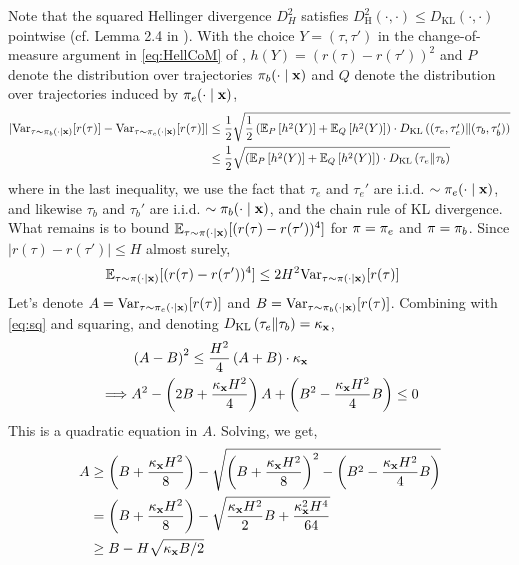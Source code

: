Note that the squared Hellinger divergence $D_H^2$ satisfies $D_{\mathrm{H}}^2 (\cdot,\cdot) \le D_{\mathrm{KL}} (\cdot,\cdot)$ pointwise (cf. Lemma 2.4 in \citet{tsybakov2009nonparametric}). With the choice $Y = (\tau,\tau')$ in the change-of-measure argument in \cref{eq:HellCoM} of , $h (Y) = ( r(\tau)-r(\tau'))^2$ and $P$ denote the distribution over trajectories $\pi_b(\cdot\mid \mathbf{x})$ and $Q$ denote the distribution over trajectories induced by $\pi_e (\cdot \mid \mathbf{x})$,
\begin{align}
| \mathrm{Var}_{\tau \sim \pi_b (\cdot \mid \mathbf{x})} [ r (\tau)  ] - \mathrm{Var}_{\tau \sim \pi_e (\cdot \mid \mathbf{x})} [ r (\tau)  ] | 
&\le \frac{1}{2} \sqrt{\frac{1}{2} \left(\mathbb{E}_P \left[h^2(Y )\right]+\mathbb{E}_Q \left[h^2(Y)\right]\right) \cdot D_{\mathrm{KL}} \left( (\tau_e,\tau_e') \|  (\tau_b, \tau_b') \right)} \nonumber\\
&\le \frac{1}{2} \sqrt{\left(\mathbb{E}_P \left[h^2(Y )\right]+\mathbb{E}_Q \left[h^2(Y)\right]\right) \cdot D_{\mathrm{KL}} \left( \tau_e \| \tau_b \right)} \label{eq:sq}
\end{align}
where in the last inequality, we use the fact that $\tau_e$ and $\tau_e'$ are i.i.d. $\sim \pi_e(\cdot\mid\mathbf{x})$, and likewise $\tau_b$ and $\tau_b'$ are i.i.d. $\sim \pi_b(\cdot\mid\mathbf{x})$, and the chain rule of KL divergence. What remains is to bound $\mathbb{E}_{\tau \sim \pi (\cdot \mid \mathbf{x})} [ ( r (\tau) - r (\tau'))^4 ]$ for $\pi = \pi_e$ and $\pi = \pi_b$. Since $|r(\tau) - r(\tau')| \le H$ almost surely,
\begin{align*}
    \mathbb{E}_{\tau \sim \pi (\cdot\mid\mathbf{x})} [ ( r (\tau) - r (\tau') )^4 ] &\le 2H^2 \mathrm{Var}_{\tau \sim \pi (\cdot\mid\mathbf{x})} [ r (\tau) ]
\end{align*}
Let's denote $A = \mathrm{Var}_{\tau \sim \pi_e (\cdot\mid\mathbf{x})} [r(\tau)]$ and $B = \mathrm{Var}_{\tau \sim \pi_b (\cdot\mid\mathbf{x})} [r(\tau)]$. Combining with \cref{eq:sq} and squaring, and denoting $D_{\mathrm{KL}} \left( \tau_e \| \tau_b \right) = \kappa_{\mathbf{x}}$,
\begin{align}
    &\left( A - B \right)^2 \le \frac{H^2}{4} \left( A + B \right) \cdot \kappa_{\mathbf{x}} \nonumber\\
    \implies &A^2 - \left( 2 B + \frac{\kappa_{\mathbf{x}} H^2}{4} \right) A + \left( B^2 - \frac{\kappa_{\mathbf{x}} H^2}{4} B \right)  \le 0 \label{eq:23}
\end{align}
This is a quadratic equation in $A$. Solving, we get,
\begin{align*}
    A &\ge \left( B + \frac{\kappa_{\mathbf{x}} H^2}{8} \right) - \sqrt{\left( B + \frac{\kappa_{\mathbf{x}} H^2}{8} \right)^2 - \left( B^2 - \frac{\kappa_{\mathbf{x}} H^2}{4} B \right)} \\
    &= \left( B + \frac{\kappa_{\mathbf{x}} H^2}{8} \right) - \sqrt{ \frac{\kappa_{\mathbf{x}} H^2}{2} B + \frac{\kappa_{\mathbf{x}}^2 H^4}{64}} \\
    &\ge B - H \sqrt{ \kappa_{\mathbf{x}} B/2}
\end{align*}
